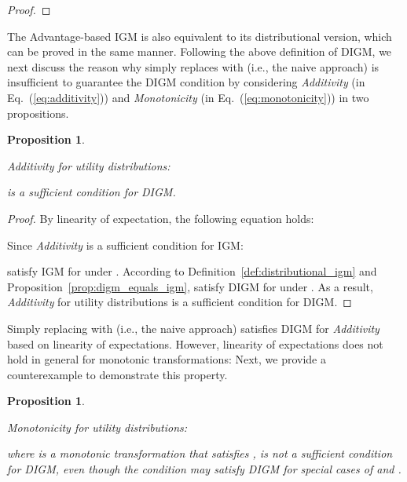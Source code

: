 \documentclass[twoside,11pt]{article}
\newcommand{\additivity}{\textit{Additivity}}
\newcommand{\monotonicity}{\textit{Monotonicity}}
\newcommand{\digm}{DIGM}
\newcounter{example0}
\newcounter{theorem0}
\newcounter{proposition0}
\newcounter{definition0}
\newtheorem{proposition}[proposition0]{Proposition}
\begin{document}
\begin{proof}

\end{proof} The Advantage-based IGM is also equivalent to its distributional version, which can be proved in the same manner.
Following the above definition of DIGM,
we next discuss the reason why simply replaces  with  (i.e., the naive approach) is insufficient to guarantee the DIGM condition by considering \additivity{} (in Eq.~(\ref{eq:additivity})) and \monotonicity{} (in Eq.~(\ref{eq:monotonicity})) in two propositions.
\begin{proposition}
\label{prop:distributional_additivity}

\additivity{} for utility distributions:

is a sufficient condition for DIGM.

\end{proposition}

\begin{proof}
By linearity of expectation, the following equation holds:

Since \additivity{} is a sufficient condition for IGM:

 satisfy IGM for  under . According to Definition~\ref{def:distributional_igm} and Proposition~\ref{prop:digm_equals_igm},  satisfy \digm{} for  under .
As a result, \additivity{} for utility distributions is a sufficient condition for \digm{}.
\end{proof} Simply replacing  with  (i.e., the naive approach) satisfies \digm{} for \additivity{} based on linearity of expectations. However, linearity of expectations does not hold in general for monotonic transformations:
 Next, we provide a counterexample to demonstrate this property.
\begin{proposition}
\label{prop:distributional_monotonicity}

\monotonicity{} for utility distributions:

where  is a monotonic transformation that satisfies , is not a sufficient condition for DIGM, even though the condition may satisfy \digm{} for special cases of  and .

\end{proposition}
\end{document}
